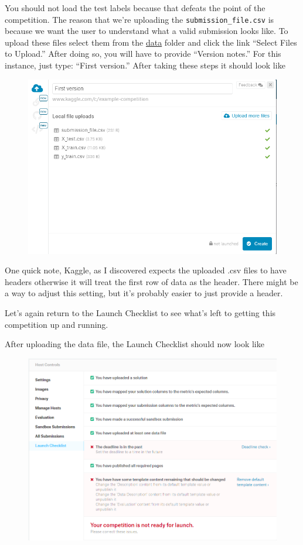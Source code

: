 \documentclass{article}
\begin{document}
You should not load the test labels because that defeats the point of
the competition. The reason that we're uploading the
\texttt{submission\_file.csv} is because we want the user to understand
what a valid submission looks like. To upload these files select them
from the \href{/data}{data} folder and click the link ``Select Files to
Upload.'' After doing so, you will have to provide ``Version notes.''
For this instance, just type: ``First version.'' After taking these
steps it should look like

\begin{figure}[H]
    \centering
    \includegraphics[width=\linewidth]{figures/data-upload-result.PNG}
\end{figure}

One quick note, Kaggle, as I discovered expects the uploaded .csv files
to have headers otherwise it will treat the first row of data as the
header. There might be a way to adjust this setting, but it's probably
easier to just provide a header.

Let's again return to the Launch Checklist to see what's left to getting
this competition up and running.

After uploading the data file, the Launch Checklist should now look like

\begin{figure}[H]
    \centering
    \includegraphics[width=\linewidth]{figures/launch-checklist3.PNG}
\end{figure}
\end{document}
